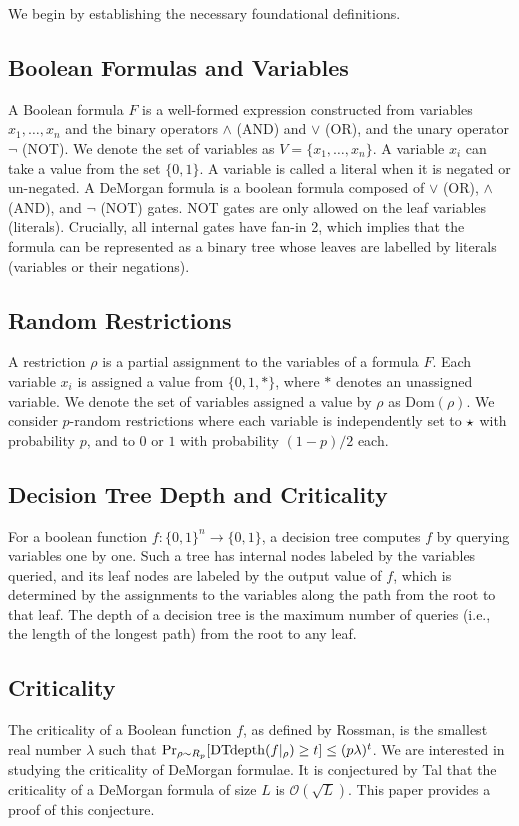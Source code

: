 \documentclass[11pt]{article}
\begin{document}
We begin by establishing the necessary foundational definitions.

\subsection{Boolean Formulas and Variables}
A Boolean formula $F$ is a well-formed expression constructed from variables $x_1, \ldots, x_n$ and the binary operators $\land$ (AND) and $\lor$ (OR), and the unary operator $\neg$ (NOT). We denote the set of variables as $V = \{x_1, \ldots, x_n\}$. A variable $x_i$ can take a value from the set $\{0, 1\}$. A variable is called a literal when it is negated or un-negated. A DeMorgan formula is a boolean formula composed of $\lor$ (OR), $\land$ (AND), and $\neg$ (NOT) gates. NOT gates are only allowed on the leaf variables (literals). Crucially, all internal gates have fan-in 2, which implies that the formula can be represented as a binary tree whose leaves are labelled by literals (variables or their negations).

\subsection{Random Restrictions}
A restriction $\rho$ is a partial assignment to the variables of a formula $F$. Each variable $x_i$ is assigned a value from $\{0, 1, *\}$, where $*$ denotes an unassigned variable. We denote the set of variables assigned a value by $\rho$ as $\text{Dom}(\rho)$. We consider $p$-random restrictions where each variable is independently set to $\star$ with probability $p$, and to $0$ or $1$ with probability $(1-p)/2$ each.

\subsection{Decision Tree Depth and Criticality}
For a boolean function $f \colon \{0,1\}^n \to \{0,1\}$, a decision tree computes $f$ by querying variables one by one. Such a tree has internal nodes labeled by the variables queried, and its leaf nodes are labeled by the output value of $f$, which is determined by the assignments to the variables along the path from the root to that leaf. The depth of a decision tree is the maximum number of queries (i.e., the length of the longest path) from the root to any leaf.

\subsection{Criticality}
The criticality of a Boolean function $f$, as defined by Rossman, is the smallest real number $\lambda$ such that $\operatorname{\Pr}_{\rho \sim R_p}[\operatorname{DTdepth}(f|_{\rho}) \geq t] \leq (p\lambda)^t$. We are interested in studying the criticality of DeMorgan formulae. It is conjectured by Tal that the criticality of a DeMorgan formula of size $L$ is $\mathcal{O}(\sqrt{L})$. This paper provides a proof of this conjecture.
\end{document}
